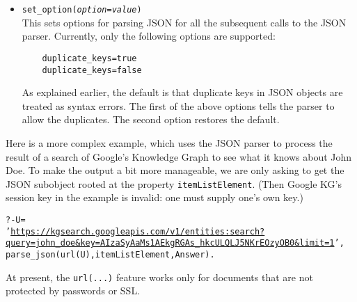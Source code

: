 \begin{itemize}
\item \texttt{set\_option(\emph{option}=\emph{value})}\\
  This sets options for parsing JSON for all the subsequent calls to the
  JSON parser. Currently, only the following options are supported:
\begin{verbatim}
    duplicate_keys=true
    duplicate_keys=false
\end{verbatim}
  As explained earlier, the default is that duplicate keys in JSON objects
  are treated as syntax errors. The first of the above options tells the
  parser to allow the duplicates. The second option restores the default.
\end{itemize}

Here is a more complex example, which uses the JSON parser to
process the result of a search of
Google's Knowledge Graph to see what it knows about John Doe.
To make the output a bit more manageable, we are only asking to get the
JSON subobject rooted at the property \texttt{itemListElement}.
(Then Google KG's
session key in the example is invalid: one must supply one's own key.)
\begin{alltt}
?- U =
'\url{https://kgsearch.googleapis.com/v1/entities:search?query=john_doe&key=AIzaSyAaMs1AEkgRGAs_hkcULQLJ5NKrEOzyOB0&limit=1}',
   parse\_json(url(U), itemListElement, Answer).
\end{alltt}
At present, the \texttt{url(...)} feature works only for documents
that are not protected by passwords or SSL. 




